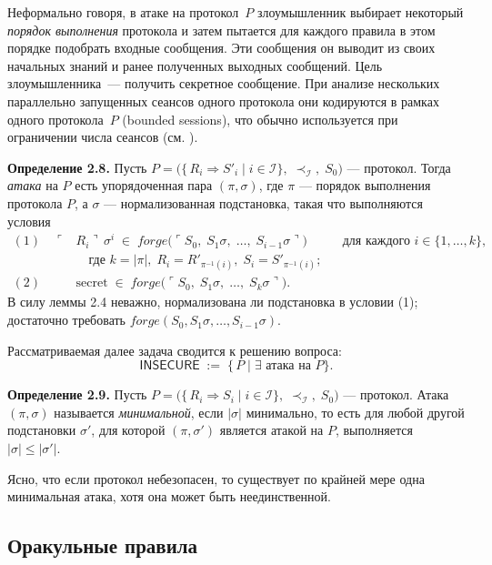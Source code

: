 Неформально говоря, в атаке на протокол~\(P\) злоумышленник выбирает некоторый \emph{порядок выполнения} протокола и затем пытается для каждого правила в этом порядке подобрать входные сообщения. Эти сообщения он выводит из своих начальных знаний и ранее полученных выходных сообщений. Цель злоумышленника~— получить секретное сообщение. При анализе нескольких параллельно запущенных сеансов одного протокола они кодируются в рамках одного протокола~\(P\) (bounded sessions), что обычно используется при ограничении числа сеансов (см. \cite{RusinowitchTuruani2001}).

\medskip
\noindent\textbf{Определение 2.8.} Пусть $P = \bigl(\{\,R_i \Rightarrow S'_i \mid i\in\mathcal{I}\},\;\prec_{\mathcal{I}},\;S_0\bigr)$ — протокол. Тогда \emph{атака} на \(P\) есть упорядоченная пара \((\pi,\sigma)\), где \(\pi\) — порядок выполнения протокола \(P\), а \(\sigma\) — нормализованная подстановка, такая что выполняются условия
\[
\begin{aligned}
(1)\quad \ulcorner&R_i\urcorner\,\sigma^i\;\in\;\mathit{forge}\bigl(\ulcorner S_0,\;S_1\sigma,\;\dots,\;S_{i-1}\sigma\urcorner\bigr)
       &&\text{для каждого }i\in\{1,\dots,k\},\\
       &\quad\text{где }k=|\pi|,\;R_i=R'_{\pi^{-1}(i)},\;S_i=S'_{\pi^{-1}(i)};\\[4pt]
(2)\quad &\text{secret}\;\in\;\mathit{forge}\bigl(\ulcorner S_0,\;S_1\sigma,\;\dots,\;S_k\sigma\urcorner\bigr).
\end{aligned}
\]
В силу леммы 2.4 неважно, нормализована ли подстановка в условии (1); достаточно требовать
\(\mathit{forge}(S_0,S_1\sigma,\dots,S_{i-1}\sigma)\).

Рассматриваемая далее задача сводится к решению вопроса:
\[
\mathsf{INSECURE} \;:=\;\{\,P \mid \exists\text{ атака на }P\}.
\]

\medskip
\noindent\textbf{Определение 2.9.} Пусть $P = \bigl(\{\,R_i \Rightarrow S_i \mid i\in\mathcal{I}\},\;\prec_{\mathcal{I}},\;S_0\bigr)$ — протокол. Атака \((\pi,\sigma)\) называется \emph{минимальной}, если \(|\sigma|\) минимально, то есть для любой другой подстановки \(\sigma'\), для которой \((\pi,\sigma')\) является атакой на \(P\), выполняется \(|\sigma|\le|\sigma'|\).

Ясно, что если протокол небезопасен, то существует по крайней мере одна минимальная атака, хотя она может быть неединственной.

\subsection{Оракульные правила}


